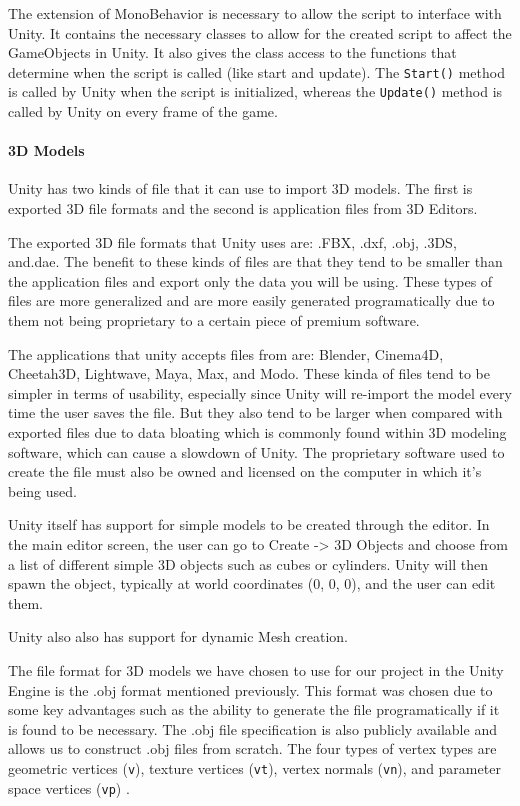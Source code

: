\documentclass[12pt]{article}
\begin{document}
The extension of MonoBehavior is necessary to allow the script to
interface with Unity. It contains the necessary classes to allow for the
created script to affect the GameObjects in Unity. It also gives the
class access to the functions that determine when the script is called
(like start and update). The \texttt{Start()} method is called by Unity
when the script is initialized, whereas the \texttt{Update()} method is
called by Unity on every frame of the game. \autocite{unityScripts}

\paragraph{3D Models}\label{d-models}

Unity has two kinds of file that it can use to import 3D models. The
first is exported 3D file formats and the second is application files
from 3D Editors.

The exported 3D file formats that Unity uses are: .FBX, .dxf, .obj,
.3DS, and.dae. The benefit to these kinds of files are that they tend to
be smaller than the application files and export only the data you will
be using. These types of files are more generalized and are more easily
generated programatically due to them not being proprietary to a certain
piece of premium software.

The applications that unity accepts files from are: Blender, Cinema4D,
Cheetah3D, Lightwave, Maya, Max, and Modo. These kinda of files tend to
be simpler in terms of usability, especially since Unity will re-import
the model every time the user saves the file. But they also tend to be
larger when compared with exported files due to data bloating which is
commonly found within 3D modeling software, which can cause a slowdown
of Unity. The proprietary software used to create the file must also be
owned and licensed on the computer in which it's being used.

Unity itself has support for simple models to be created through the
editor. In the main editor screen, the user can go to Create
-\textgreater{} 3D Objects and choose from a list of different simple 3D
objects such as cubes or cylinders. Unity will then spawn the object,
typically at world coordinates (0, 0, 0), and the user can edit them.

Unity also also has support for dynamic Mesh creation.

The file format for 3D models we have chosen to use for our project in
the Unity Engine is the .obj format mentioned previously. This format
was chosen due to some key advantages such as the ability to generate
the file programatically if it is found to be necessary. The .obj file
specification is also publicly available and allows us to construct .obj
files from scratch. The four types of vertex types are geometric
vertices (\texttt{v}), texture vertices (\texttt{vt}), vertex normals
(\texttt{vn}), and parameter space vertices (\texttt{vp})
\autocite{obj}.
\end{document}
